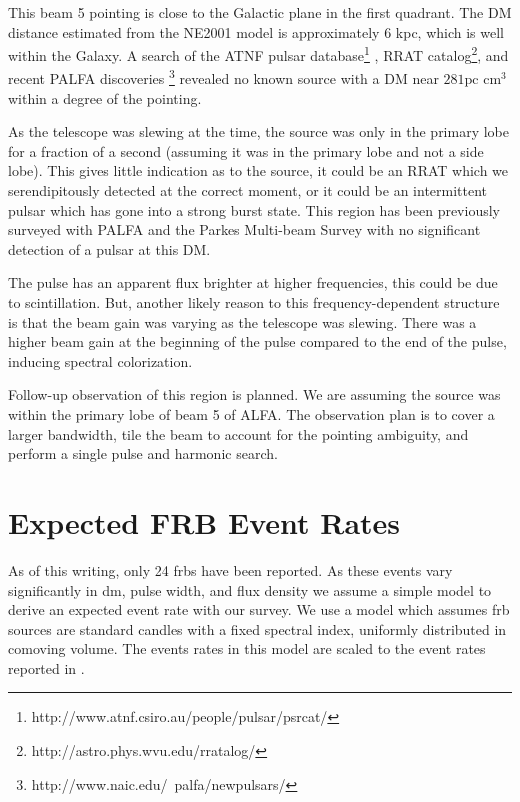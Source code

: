 \documentclass[a4paper,fleqn,usenatbib]{mnras}
\begin{document}
This beam 5 pointing is close to the Galactic plane in the first quadrant. The
DM distance estimated from the NE2001 model \citep{2002astro.ph..7156C} is
approximately 6 kpc, which is well within the Galaxy. A search of the ATNF
pulsar database\footnote{http://www.atnf.csiro.au/people/pulsar/psrcat/}
\citep{2005AJ....129.1993M}, RRAT
catalog\footnote{http://astro.phys.wvu.edu/rratalog/}, and recent PALFA
discoveries \footnote{http://www.naic.edu/~palfa/newpulsars/} revealed no known
source with a DM near $281 \textrm{pc cm}^3$ within a degree of the pointing.

As the telescope was slewing at the time, the source was only in the primary
lobe for a fraction of a second (assuming it was in the primary lobe and not a
side lobe). This gives little indication as to the source, it could be an RRAT
which we serendipitously detected at the correct moment, or it could be an
intermittent pulsar which has gone into a strong burst state. This region has
been previously surveyed with PALFA and the Parkes Multi-beam Survey
\citep{2001MNRAS.328...17M} with no significant detection of a pulsar at this
DM.

The pulse has an apparent flux brighter at higher frequencies, this could be due
to scintillation. But, another likely reason to this frequency-dependent
structure is that the beam gain was varying as the telescope was slewing. There
was a higher beam gain at the beginning of the pulse compared to the end of the
pulse, inducing spectral colorization.

Follow-up observation of this region is planned. We are assuming the source was
within the primary lobe of beam 5 of ALFA. The observation plan is to cover a
larger bandwidth, tile the beam to account for the pointing ambiguity, and
perform a single pulse and harmonic search.



\section{Expected FRB Event Rates}
\label{sec:event_rates}

As of this writing, only 24 \glspl{frb} have been reported. As these events vary
significantly in \gls{dm}, pulse width, and flux density we assume a simple
model to derive an expected event rate with our survey.  We use a model
\citep{2013MNRAS.436L...5L} which assumes \gls{frb} sources are standard candles
with a fixed spectral index, uniformly distributed in comoving volume. The
events rates in this model are scaled to the event rates reported in
\cite{2013Sci...341...53T}.
\end{document}
